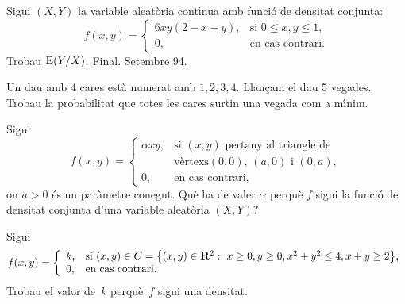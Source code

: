 \begin{prob}
{Sigui $(X,Y)$ la variable aleat\`oria cont\'{\i}nua amb funci\'o de densitat
conjunta:
$$f(x,y)=
\left\{\begin{array}{ll}
6 xy(2-x-y), & \text{si $0\leq x,y\leq 1$},\\ 0, & \text{en cas
contrari.}
\end{array}\right.
$$Trobau ${\rm E} (Y/X)$.\newline
{\footnotesize Final. Setembre 94.}}
\end{prob}


\begin{prob}
{
Un dau amb $4$ cares est\`a numerat amb $1,2,3,4$.
Llan\c{c}am el dau 5 vegades. 
Trobau la probabilitat que totes les cares surtin una vegada 
com a m\'{\i}nim.
}
\end{prob}

\begin{prob}
{
Sigui 
\[
f(x,y)=
\left\{
\begin{array}{ll}
\alpha x y, & \text{si $(x,y)$ pertany al triangle de} \\
& \text{v\`ertexs
$(0,0)$, $(a,0)$ i $(0,a)$},\\ 0, & \text{en cas contrari,}
\end{array}
\right.
\]
on $a>0$ \'es un par\`ametre conegut. Qu\`e ha de valer $\alpha$ perqu\`e $f$
sigui la funci\'o de densitat conjunta d'una variable aleat\`oria $(X,Y)$?
}
\end{prob}

\begin{prob}
{
Sigui 
\[
f(x,y)=
\left\{
\begin{array}{ll}
k, & \mbox{si $(x,y)\in C=\left\{(x,y)\in {\bf R}^2 :\ x\geq 0, y\geq 0,
x^2+y^2\leq 4, x+y\geq 2\right\}$},\\
0, & \mbox{en cas contrari.}
\end{array}
\right.
\]
Trobau el valor de~$k$ perqu\`e~$f$ sigui una densitat.
}
\end{prob}


